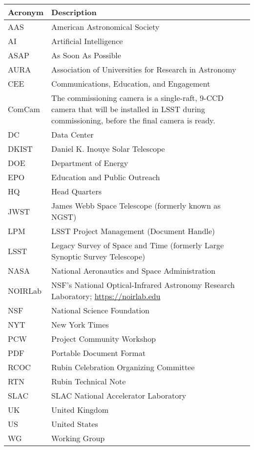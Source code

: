 \addtocounter{table}{-1}
\begin{longtable}{p{}p{}}\hline
\textbf{Acronym} & \textbf{Description}  \\\hline

AAS & American Astronomical Society \\\hline
AI & Artificial Intelligence \\\hline
ASAP & As Soon As Possible \\\hline
AURA & Association of Universities for Research in Astronomy \\\hline
CEE & Communications, Education, and Engagement \\\hline
ComCam & The commissioning camera is a single-raft, 9-CCD camera that will be installed in LSST during commissioning, before the final camera is ready. \\\hline
DC & Data Center \\\hline
DKIST & Daniel K. Inouye Solar Telescope \\\hline
DOE & Department of Energy \\\hline
EPO & Education and Public Outreach \\\hline
HQ & Head Quarters \\\hline
JWST & James Webb Space Telescope (formerly known as NGST) \\\hline
LPM & LSST Project Management (Document Handle) \\\hline
LSST & Legacy Survey of Space and Time (formerly Large Synoptic Survey Telescope) \\\hline
NASA & National Aeronautics and Space Administration \\\hline
NOIRLab & NSF's National Optical-Infrared Astronomy Research Laboratory; \url{https://noirlab.edu} \\\hline
NSF & National Science Foundation \\\hline
NYT & New York Times \\\hline
PCW & Project Community Workshop \\\hline
PDF & Portable Document Format \\\hline
RCOC & Rubin Celebration Organizing Committee \\\hline
RTN & Rubin Technical Note \\\hline
SLAC & SLAC National Accelerator Laboratory \\\hline
UK & United Kingdom \\\hline
US & United States \\\hline
WG & Working Group \\\hline
\end{longtable}
